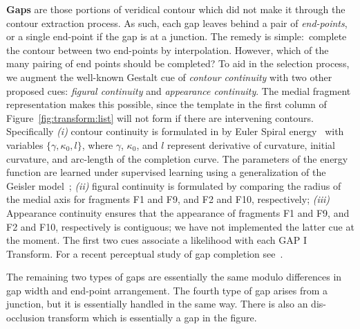 \textbf{Gaps} are those portions of veridical contour which did not make it through the contour
extraction process. As such, each gap leaves behind a pair of \textit{end-points}, or a single end-point if the gap is at a junction. The remedy is simple:\ complete the contour
between two end-points by interpolation. However, which of the many pairing of end points  should  be completed? To aid in the selection process, we augment the well-known Gestalt cue of {\em contour continuity} with two other proposed cues: {\em figural continuity} and {\em appearance continuity}.
The medial fragment representation makes this possible, since the template in the first column of Figure~\ref{fig:transform:list} will not form if
there are intervening contours. Specifically {\em (i)} contour continuity
is formulated in by Euler Spiral energy~\cite{Kimia:Euler:Spiral:IJCV03}
with  variables $\{\gamma, \kappa_0,l\}$, where $\gamma$, $\kappa_0$, and $l$ represent derivative of curvature, initial curvature, and arc-length
of the completion curve. The parameters of the energy function are learned
under supervised learning using a generalization of the Geisler model~\cite{Geisler:Vision:Journal};
{\em (ii)} figural continuity is formulated by comparing the radius of the medial
axis for fragments F1 and  F9, and F2 and F10, respectively; {\em (iii)} Appearance
continuity ensures that the appearance of fragments F1 and  F9, and F2 and F10, respectively is contiguous; we have not implemented the latter
cue at the moment. The first two cues associate a likelihood with each GAP I Transform. For a recent perceptual study of gap completion see~\cite{Narayanan:Kimia:POCV12}.



The remaining two types of gaps are essentially the same modulo differences in gap width
and end-point arrangement.  The fourth type of gap arises from a junction, but it is essentially
handled in the same way. There is also an dis-occlusion transform which
is essentially a gap in the figure.  


